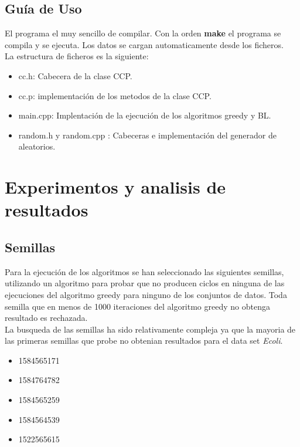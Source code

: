 \section{Guía de Uso}

El programa el muy sencillo de compilar. Con la orden \textbf{make} el programa se compila y se ejecuta. Los datos se cargan automaticamente desde los ficheros.\\
La estructura de ficheros es la siguiente:
\begin{itemize}
   \item cc.h: Cabecera de la clase CCP.
   \item cc.p: implementación de los metodos de la clase CCP.
   \item main.cpp: Implentación de la ejecución de los algoritmos greedy y BL.
   \item random.h y random.cpp : Cabeceras e implementación del generador de aleatorios.
\end{itemize}

\chapter{Experimentos y analisis de resultados}
\section{Semillas}
Para la ejecución de los algoritmos se han seleccionado las siguientes semillas, utilizando un algoritmo para probar que no producen ciclos en ninguna de las ejecuciones del algoritmo greedy para ninguno de los conjuntos de datos. Toda semilla que en menos de 1000 iteraciones del algoritmo greedy no obtenga resultado es rechazada. \\
La busqueda de las semillas ha sido relativamente compleja ya que la mayoria de las primeras semillas que probe no obtenian resultados para el data set \emph{Ecoli}.
\begin{itemize}
   \item 1584565171
   \item 1584764782
   \item 1584565259
   \item 1584564539
   \item 1522565615
\end{itemize}

